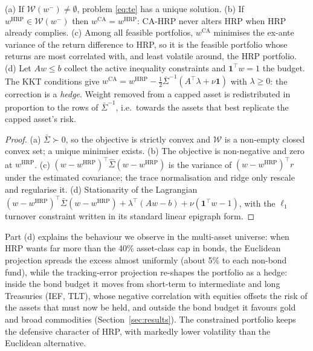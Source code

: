 \begin{proposition}\label{prop:te}
(a) If $\mathcal{W}(w^-)\neq\emptyset$, problem \eqref{eq:te} has a unique solution.
(b) If $w^{\mathrm{HRP}}\in\mathcal{W}(w^-)$ then $w^{\mathrm{CA}}=w^{\mathrm{HRP}}$:
CA-HRP never alters HRP when HRP already complies.
(c) Among all feasible portfolios, $w^{\mathrm{CA}}$ minimises the ex-ante variance of
the return difference to HRP, so it is the feasible portfolio whose returns are most
correlated with, and least volatile around, the HRP portfolio.
(d) Let $A w\le b$ collect the active inequality constraints and $\mathbf 1^\top w=1$ the
budget. The KKT conditions give
$w^{\mathrm{CA}}=w^{\mathrm{HRP}}-\tfrac12\bar\Sigma^{-1}(A^\top\lambda+\nu\mathbf{1})$
with $\lambda\ge0$: the correction is a \emph{hedge}. Weight removed from a capped
asset is redistributed in proportion to the rows of $\bar\Sigma^{-1}$, i.e.\ towards the
assets that best replicate the capped asset's risk.
\end{proposition}
\begin{proof}
(a) $\bar\Sigma\succ0$, so the objective is strictly convex and $\mathcal{W}$ is a non-empty
closed convex set; a unique minimiser exists. (b) The objective is non-negative and zero at
$w^{\mathrm{HRP}}$. (c) $(w-w^{\mathrm{HRP}})^\top\hat\Sigma(w-w^{\mathrm{HRP}})$ is the
variance of $(w-w^{\mathrm{HRP}})^\top r$ under the estimated covariance; the trace
normalisation and ridge only rescale and regularise it. (d) Stationarity of the
Lagrangian $(w-w^{\mathrm{HRP}})^\top\bar\Sigma(w-w^{\mathrm{HRP}})+\lambda^\top(Aw-b)
+\nu(\mathbf{1}^\top w-1)$, with the $\ell_1$ turnover constraint written in its standard
linear epigraph form.
\end{proof}

Part (d) explains the behaviour we observe in the multi-asset universe: when HRP wants far
more than the 40\% asset-class cap in bonds, the Euclidean projection spreads the excess
almost uniformly (about 5\% to each non-bond fund), while the tracking-error projection
re-shapes the portfolio as a hedge: inside the bond budget it moves from short-term to
intermediate and long Treasuries (IEF, TLT), whose negative correlation with equities
offsets the risk of the assets that must now be held, and outside the bond budget it
favours gold and broad commodities (Section~\ref{sec:results}). The constrained portfolio
keeps the defensive character of HRP, with markedly lower volatility than the Euclidean
alternative.

